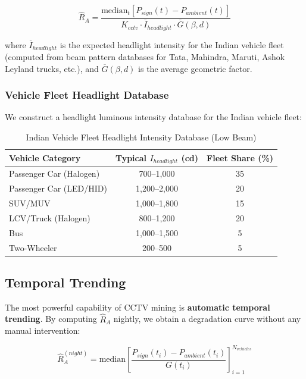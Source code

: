 \documentclass[11pt,a4paper]{article}
\begin{document}
\begin{equation}
\hat{R}_A = \frac{\text{median}_t\left[P_{sign}(t) - P_{ambient}(t)\right]}{K_{cctv} \cdot \overline{I}_{headlight} \cdot \overline{G}(\beta, d)}
\label{eq:cctv_estimation}
\end{equation}

where $\overline{I}_{headlight}$ is the expected headlight intensity for the Indian vehicle fleet (computed from beam pattern databases for Tata, Mahindra, Maruti, Ashok Leyland trucks, etc.), and $\overline{G}(\beta, d)$ is the average geometric factor.

\subsubsection{Vehicle Fleet Headlight Database}

We construct a headlight luminous intensity database for the Indian vehicle fleet:

\begin{table}[H]
\centering
\caption{Indian Vehicle Fleet Headlight Intensity Database (Low Beam)}
\label{tab:headlight_db}
\begin{tabular}{@{}lcc@{}}
\toprule
\textbf{Vehicle Category} & \textbf{Typical $I_{headlight}$ (cd)} & \textbf{Fleet Share (\%)} \\
\midrule
Passenger Car (Halogen) & 700--1,000 & 35 \\
Passenger Car (LED/HID) & 1,200--2,000 & 20 \\
SUV/MUV & 1,000--1,800 & 15 \\
LCV/Truck (Halogen) & 800--1,200 & 20 \\
Bus & 1,000--1,500 & 5 \\
Two-Wheeler & 200--500 & 5 \\
\bottomrule
\end{tabular}
\end{table}

\subsection{Temporal Trending}

The most powerful capability of CCTV mining is \textbf{automatic temporal trending}. By computing $\hat{R}_A$ nightly, we obtain a degradation curve without any manual intervention:

\begin{equation}
\hat{R}_A^{(night)} = \text{median}\left[\frac{P_{sign}(t_i) - P_{ambient}(t_i)}{G(t_i)}\right]_{i=1}^{N_{vehicles}}
\label{eq:nightly_ra}
\end{equation}
\end{document}
